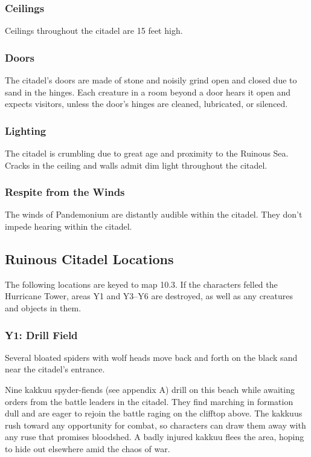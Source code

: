 \documentclass[10pt,a4paper,twoside,bg=print,twocolumn,openany,nodeprecatedcode]{dndbook}
\begin{document}
\subsubsection{Ceilings}
Ceilings throughout the citadel are 15 feet high.

\subsubsection{Doors}
The citadel's doors are made of stone and noisily grind open and closed due to sand in the hinges. Each creature in a room beyond a door hears it open and expects visitors, unless the door's hinges are cleaned, lubricated, or silenced.

\subsubsection{Lighting}
The citadel is crumbling due to great age and proximity to the Ruinous Sea. Cracks in the ceiling and walls admit dim light throughout the citadel.

\subsubsection{Respite from the Winds}
The winds of Pandemonium are distantly audible within the citadel. They don't impede hearing within the citadel.

\subsection{Ruinous Citadel Locations}
The following locations are keyed to map 10.3. If the characters felled the Hurricane Tower, areas Y1 and Y3–Y6 are destroyed, as well as any creatures and objects in them.

\subsubsection{Y1: Drill Field}
\begin{DndReadAloud}{}
Several bloated spiders with wolf heads move back and forth on the black sand near the citadel's entrance.

\end{DndReadAloud}

Nine kakkuu spyder-fiends (see appendix A) drill on this beach while awaiting orders from the battle leaders in the citadel. They find marching in formation dull and are eager to rejoin the battle raging on the clifftop above. The kakkuus rush toward any opportunity for combat, so characters can draw them away with any ruse that promises bloodshed. A badly injured kakkuu flees the area, hoping to hide out elsewhere amid the chaos of war.
\end{document}
